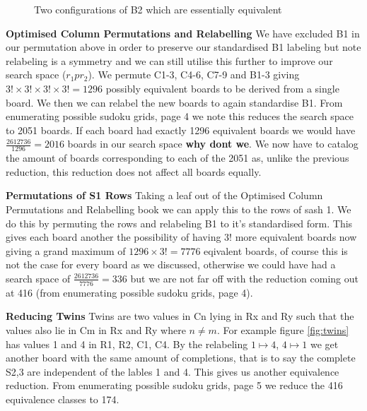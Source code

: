 \documentclass[a4paper,11pt]{report}
\newcounter{row}
\newcounter{col}
\newcounter{rowb}
\newcounter{colb}
\newcommand\setrowb[3]{
  \setcounter{colb}{1}
  \foreach \n in {#1, #2, #3} {
    \edef\x{\value{colb} - 0.5}
    \edef\y{3.5 - \value{rowb}}
    \node[anchor=center] at (\x, \y) {\n};
    \stepcounter{colb}
  }
  \stepcounter{rowb}
}
\begin{document}
\begin{figure}[h!]
\centering
{}
\caption{\label{fig:equiv99}Two configurations of B2 which are essentially equivalent}
\end{figure}

\textbf{Optimised Column Permutations and Relabelling}
We have excluded B1 in our permutation above in order to preserve our standardised B1 labeling but note relabeling is a symmetry and we can still utilise this further to improve our search space ($r_1pr_2$). We permute C1-3, C4-6, C7-9 and B1-3 giving $3!\times 3!\times 3! \times 3!=1296$ possibly equivalent boards to be derived from a single board. We then we can relabel the new boards to again standardise B1. From \cite{}enumerating possible sudoku grids, page 4 we note this reduces the search space to 2051 boards. If each board had exactly 1296 equivalent boards we would have $\frac{2612736}{1296}= 2016$ boards in our search space \textbf{why dont we}.  We now have to catalog the amount of boards corresponding to each of the 2051 as, unlike the previous reduction, this reduction does not affect all boards equally.

\textbf{Permutations of S1 Rows}
Taking a leaf out of the Optimised Column Permutations and Relabelling book we can apply this to the rows of sash 1. We do this by permuting the rows and relabeling B1 to it's standardised form. This gives each board another the possibility of having $3!$ more equivalent boards now giving a grand maximum of $1296\times 3!=7776$ eqivalent boards, of course this is not the case for every board as we discussed, otherwise we could have had a search space of $\frac{2612736}{7776}=336$ but we are not far off with the reduction coming out at 416 (from \cite{}enumerating possible sudoku grids, page 4).

\textbf{Reducing Twins}
Twins are two values in Cn lying in Rx and Ry such that the values also lie in Cm in Rx and Ry where $n\neq m$. For example figure \ref{fig:twins} has values 1 and 4 in R1, R2, C1, C4. By the relabeling $1\mapsto 4$, $4\mapsto 1$ we get another board with the same amount of completions, that is to say the complete S2,3 are independent of the lables 1 and 4. This gives us another equivalence reduction. From \cite{}enumerating possible sudoku grids, page 5 we reduce the 416 equivalence classes to 174.
\end{document}
